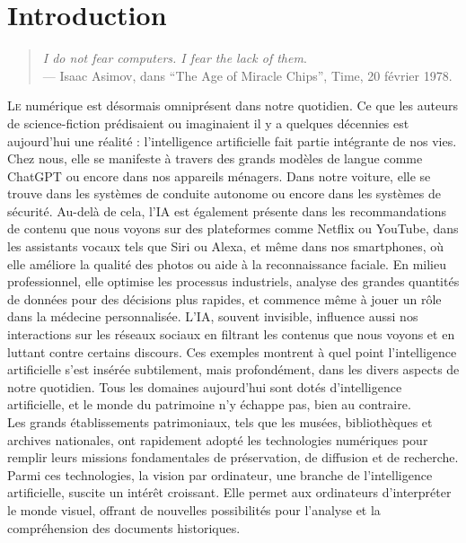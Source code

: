 \documentclass[a4paper,12pt,twoside]{book}
\begin{document}
\newpage{\pagestyle{empty}\cleardoublepage}
	

\printbibliography

	
\chapter{Introduction}	
\begin{quotation}
	\textit{ I do not fear computers. I fear the lack of them}. \\
	— Isaac Asimov, dans “The Age of Miracle Chips”, Time, 20 février 1978.
\end{quotation}
\bigbreak

\lettrine {L}e numérique est désormais omniprésent dans notre quotidien. Ce que
les auteurs de science-fiction prédisaient ou imaginaient il y a quelques
décennies est aujourd'hui une réalité : l’intelligence artificielle fait partie
intégrante de nos vies. Chez nous, elle se manifeste à travers des grands
modèles de langue comme ChatGPT ou encore dans nos appareils ménagers. Dans notre voiture, elle se trouve dans les systèmes de conduite autonome ou encore dans les systèmes
de sécurité. Au-delà de cela, l’IA est également présente dans les
recommandations de contenu que nous voyons sur des plateformes comme
Netflix ou YouTube, dans les assistants vocaux tels que Siri ou Alexa, et même
dans nos smartphones, où elle améliore la qualité des photos ou aide à la
reconnaissance faciale. En milieu professionnel, elle optimise les processus
industriels, analyse des grandes quantités de données pour des décisions plus
rapides, et commence même à jouer un rôle dans la médecine personnalisée.
L’IA, souvent invisible, influence aussi nos interactions sur les réseaux sociaux
en filtrant les contenus que nous voyons et en luttant contre certains discours.
Ces exemples montrent à quel point l’intelligence artificielle s’est insérée
subtilement, mais profondément, dans les divers aspects de notre quotidien.
Tous les domaines aujourd’hui sont dotés d’intelligence artificielle, et le monde
du patrimoine n’y échappe pas, bien au contraire.
\\

Les grands établissements patrimoniaux, tels que les musées, bibliothèques et archives nationales, ont rapidement adopté les technologies numériques pour remplir leurs missions fondamentales de préservation, de diffusion et de recherche. Parmi ces technologies, la vision par ordinateur, une branche de l'intelligence artificielle, suscite un intérêt croissant. Elle permet aux ordinateurs d'interpréter le monde visuel, offrant de nouvelles possibilités pour l'analyse et la compréhension des documents historiques.
\end{document}
